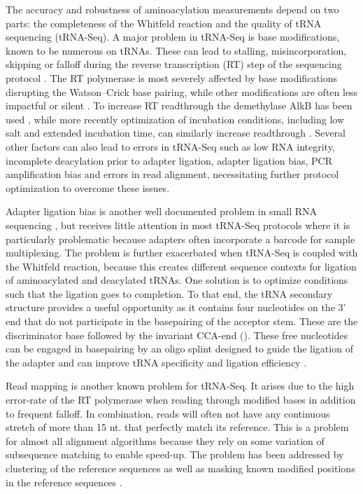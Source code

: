 \documentclass[9pt,lineno]{elife}
\begin{document}
The accuracy and robustness of aminoacylation measurements depend on two parts: the completeness of the Whitfeld reaction and the quality of tRNA sequencing (tRNA-Seq).
A major problem in tRNA-Seq is base modifications, known to be numerous on tRNAs.
These can lead to stalling, misincorporation, skipping or falloff during the reverse transcription (RT) step of the sequencing protocol \citep{Motorin2007-nb}.
The RT polymerase is most severely affected by base modifications disrupting the Watson–Crick base pairing, while other modifications are often less impactful or silent \citep{Wang2021-fc, Sas-Chen2019-um}.
To increase RT readthrough the demethylase AlkB has been used \citep{Zheng2015-kj, Cozen2015-cx}, while more recently optimization of incubation conditions, including low salt and extended incubation time, can similarly increase readthrough \citep{Behrens2021-gb}.
Several other factors can also lead to errors in tRNA-Seq such as low RNA integrity, incomplete deacylation prior to adapter ligation, adapter ligation bias, PCR amplification bias and errors in read alignment, necessitating further protocol optimization to overcome these issues. 

Adapter ligation bias is another well documented problem in small RNA sequencing \citep{Fuchs2015-nb, Zhuang2012-nu}, but receives little attention in most tRNA-Seq protocols where it is particularly problematic because adapters often incorporate a barcode for sample multiplexing.
The problem is further exacerbated when tRNA-Seq is coupled with the Whitfeld reaction, because this creates different sequence contexts for ligation of aminoacylated and deacylated tRNAs.
One solution is to optimize conditions such that the ligation goes to completion.
To that end, the tRNA secondary structure provides a useful opportunity as it contains four nucleotides on the 3’ end that do not participate in the basepairing of the acceptor stem.
These are the discriminator base followed by the invariant CCA-end ().
These free nucleotides can be engaged in basepairing by an oligo splint designed to guide the ligation of the adapter and can improve tRNA specificity and ligation efficiency \citep{Shigematsu2017-tv, Smith2015-ht}.

Read mapping is another known problem for tRNA-Seq.
It arises due to the high error-rate of the RT polymerase when reading through modified bases in addition to frequent falloff.
In combination, reads will often not have any continuous stretch of more than 15 nt. that perfectly match its reference.
This is a problem for almost all alignment algorithms because they rely on some variation of subsequence matching to enable speed-up.
The problem has been addressed by clustering of the reference sequences \citep{Hoffmann2018-uz} as well as masking known modified positions in the reference sequences \citep{Behrens2021-gb}.
\end{document}
